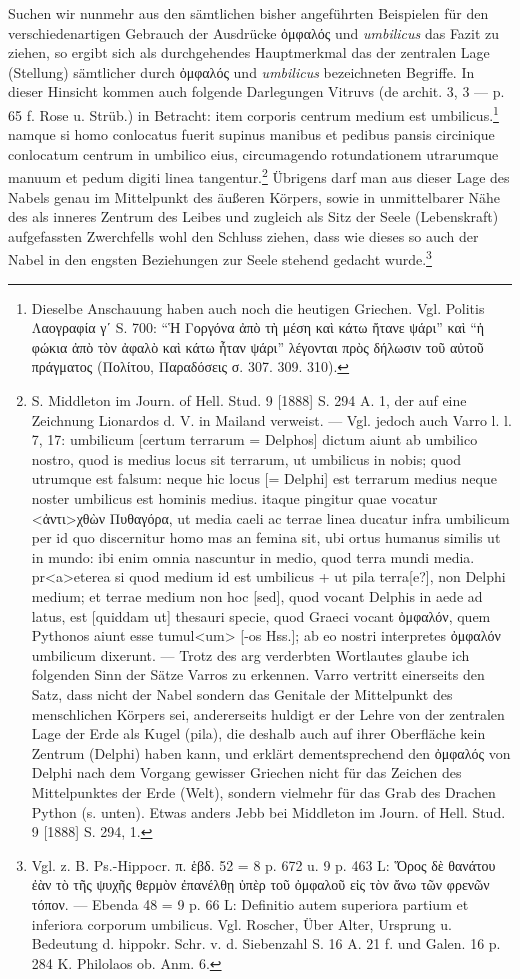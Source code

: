\documentclass[a4paper, 11pt, oneside]{article}
\begin{document}
Suchen wir nunmehr aus den sämtlichen bisher angeführten Beispielen für den verschiedenartigen Gebrauch der Ausdrücke ὀμφαλός und \emph{umbilicus} das Fazit zu ziehen, so ergibt sich als durchgehendes Hauptmerkmal das der zentralen Lage (Stellung) sämtlicher durch ὀμφαλός und \emph{umbilicus} bezeichneten Begriffe. In dieser Hinsicht kommen auch folgende Darlegungen Vitruvs (de archit. 3, 3 --- p. 65 f. Rose u. Strüb.) in Betracht: item corporis centrum medium est umbilicus.\footnote{Dieselbe Anschauung haben auch noch die heutigen Griechen. Vgl. Politis Λαογραφία γʹ S. 700: "`Ἡ Γοργόνα ἀπὸ τὴ μέση καὶ κάτω ἤτανε ψάρι"' καὶ "`ἡ φώκια ἀπὸ τὸν ἀφαλὸ καὶ κάτω ἦταν ψάρι"' λέγονται πρὸς δήλωσιν τοῦ αὐτοῦ πράγματος (Πολίτου, Παραδόσεις σ. 307. 309. 310).} namque si homo conlocatus fuerit supinus manibus et pedibus pansis circinique conlocatum centrum in umbilico eius, circumagendo rotundationem utrarumque manuum et pedum digiti linea tangentur.\footnote{S. Middleton im Journ. of Hell. Stud. 9 [1888] S. 294 A. 1, der auf eine Zeichnung Lionardos d. V. in Mailand verweist. --- Vgl. jedoch auch Varro l. l. 7, 17: umbilicum [certum terrarum = Delphos] dictum aiunt ab umbilico nostro, quod is medius locus sit terrarum, ut umbilicus in nobis; quod utrumque est falsum: neque hic locus [= Delphi] est terrarum medius neque noster umbilicus est hominis medius. itaque pingitur quae vocatur <ἀντι>χθὼν Πυθαγόρα, ut media caeli ac terrae linea ducatur infra umbilicum per id quo discernitur homo mas an femina sit, ubi ortus humanus similis ut in mundo: ibi enim omnia nascuntur in medio, quod terra mundi media. pr<a>eterea si quod medium id est umbilicus + ut pila terra[e?], non Delphi medium; et terrae medium non hoc [sed], quod vocant Delphis in aede ad latus, est [quiddam ut] thesauri specie, quod Graeci vocant ὀμφαλόν, quem Pythonos aiunt esse tumul<um> [-os Hss.]; ab eo nostri interpretes ὀμφαλόν umbilicum dixerunt. --- Trotz des arg verderbten Wortlautes glaube ich folgenden Sinn der Sätze Varros zu erkennen. Varro vertritt einerseits den Satz, dass nicht der Nabel sondern das Genitale der Mittelpunkt des menschlichen Körpers sei, andererseits huldigt er der Lehre von der zentralen Lage der Erde als Kugel (pila), die deshalb auch auf ihrer Oberfläche kein Zentrum (Delphi) haben kann, und erklärt dementsprechend den ὀμφαλός von Delphi nach dem Vorgang gewisser Griechen nicht für das Zeichen des Mittelpunktes der Erde (Welt), sondern vielmehr für das Grab des Drachen Python (s. unten). Etwas anders Jebb bei Middleton im Journ. of Hell. Stud. 9 [1888] S. 294, 1.} Übrigens darf man aus dieser Lage des Nabels genau im Mittelpunkt des äußeren Körpers, sowie in unmittelbarer Nähe des als inneres Zentrum des Leibes und zugleich als Sitz der Seele (Lebenskraft) aufgefassten Zwerchfells wohl den Schluss ziehen, dass wie dieses so auch der Nabel in den engsten Beziehungen zur Seele stehend gedacht wurde.\footnote{Vgl. z. B. Ps.-Hippocr. π. ἑβδ. 52 = 8 p. 672 u. 9 p. 463 L: Ὅρος δὲ θανάτου ἐὰν τὸ τῆς ψυχῆς θερμὸν ἐπανέλθῃ ὑπὲρ τοῦ ὀμφαλοῦ εἰς τὸν ἄνω τῶν φρενῶν τόπον. --- Ebenda 48 = 9 p. 66 L: Definitio autem superiora partium et inferiora corporum umbilicus. Vgl. Roscher, Über Alter, Ursprung u. Bedeutung d. hippokr. Schr. v. d. Siebenzahl S. 16 A. 21 f. und Galen. 16 p. 284 K. Philolaos ob. Anm. 6.} 
\end{document}
